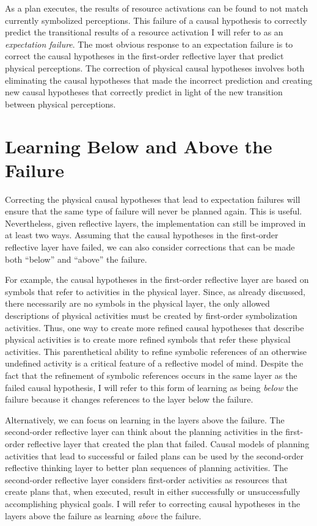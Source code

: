As a plan executes, the results of resource activations can be found
to not match currently symbolized perceptions.  This failure of a
causal hypothesis to correctly predict the transitional results of a
resource activation I will refer to as an \emph{expectation failure}.
The most obvious response to an expectation failure is to correct the
causal hypotheses in the first-order reflective layer that predict
physical perceptions.  The correction of physical causal hypotheses
involves both eliminating the causal hypotheses that made the
incorrect prediction and creating new causal hypotheses that correctly
predict in light of the new transition between physical perceptions.

\section{Learning Below and Above the Failure}

Correcting the physical causal hypotheses that lead to expectation
failures will ensure that the same type of failure will never be
planned again.  This is useful.  Nevertheless, given reflective
layers, the implementation can still be improved in at least two ways.
Assuming that the causal hypotheses in the first-order reflective
layer have failed, we can also consider corrections that can be made
both ``below'' and ``above'' the failure.

For example, the causal hypotheses in the first-order reflective layer
are based on symbols that refer to activities in the physical layer.
Since, as already discussed, there necessarily are no symbols in the
physical layer, the only allowed descriptions of physical activities
must be created by first-order symbolization activities.  Thus, one
way to create more refined causal hypotheses that describe physical
activities is to create more refined symbols that refer these physical
activities.  This parenthetical ability to refine symbolic references
of an otherwise undefined activity is a critical feature of a
reflective model of mind.  Despite the fact that the refinement of
symbolic references occurs in the same layer as the failed causal
hypothesis, I will refer to this form of learning as being
\emph{below} the failure because it changes references to the layer
below the failure.

Alternatively, we can focus on learning in the layers above the
failure.  The second-order reflective layer can think about the
planning activities in the first-order reflective layer that created
the plan that failed.  Causal models of planning activities that lead
to successful or failed plans can be used by the second-order
reflective thinking layer to better plan sequences of planning
activities.  The second-order reflective layer considers first-order
activities as resources that create plans that, when executed, result
in either successfully or unsuccessfully accomplishing physical goals.
I will refer to correcting causal hypotheses in the layers above the
failure as learning \emph{above} the failure.

